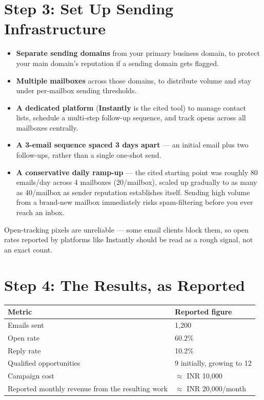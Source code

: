 \section{Step 3: Set Up Sending Infrastructure}

\begin{itemize}
  \item \textbf{Separate sending domains} from your primary business domain, to protect your main domain's
  reputation if a sending domain gets flagged.
  \item \textbf{Multiple mailboxes} across those domains, to distribute volume and stay under per-mailbox
  sending thresholds.
  \item \textbf{A dedicated platform} (\textbf{Instantly} is the cited tool) to manage contact lists, schedule a
  multi-step follow-up sequence, and track opens across all mailboxes centrally.
  \item \textbf{A 3-email sequence spaced 3 days apart} — an initial email plus two follow-ups, rather than a
  single one-shot send.
  \item \textbf{A conservative daily ramp-up} — the cited starting point was roughly 80 emails/day across 4
  mailboxes (20/mailbox), scaled up gradually to as many as 40/mailbox as sender reputation establishes itself.
  Sending high volume from a brand-new mailbox immediately risks spam-filtering before you ever reach an inbox.
\end{itemize}

\begin{caution}
Open-tracking pixels are unreliable — some email clients block them, so open rates reported by platforms like
Instantly should be read as a rough signal, not an exact count.
\end{caution}

\section{Step 4: The Results, as Reported}

\begin{longtable}{p{} p{}}
\toprule
\textbf{Metric} & \textbf{Reported figure} \\
\midrule
\endhead
Emails sent & 1,200 \\
Open rate & 60.2\% \\
Reply rate & 10.2\% \\
Qualified opportunities & 9 initially, growing to 12 \\
Campaign cost & $\approx$ INR 10,000 \\
Reported monthly revenue from the resulting work & $\approx$ INR 20,000/month \\
\bottomrule
\end{longtable}

